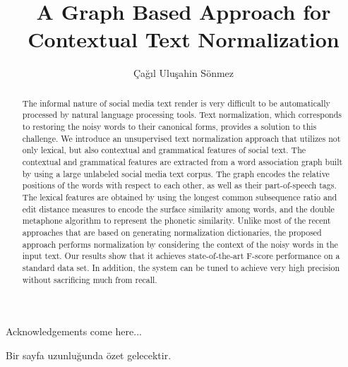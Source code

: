 \documentclass[a4paper,onesided,12pt]{report}
\title{A Graph Based Approach for Contextual Text Normalization}
\author{Çağıl Uluşahin Sönmez}
\begin{document}
\makemstitle %
\makeapprovalpage
\begin{acknowledgements}
Acknowledgements come here...
\end{acknowledgements}
\begin{abstract}
The informal nature of social media text render is very difficult to be automatically processed by natural language processing tools. Text normalization, which corresponds to restoring the noisy words to their canonical forms, provides a solution to this challenge.
We introduce an unsupervised text normalization approach that utilizes not only lexical, but also contextual and grammatical features of social text.
The contextual and grammatical features are extracted from a word association graph built by using a large unlabeled social media text corpus.
The graph encodes the relative positions of the words with respect to each other, as well as their part-of-speech tags.
The lexical features are obtained by using the longest common subsequence ratio and edit distance measures to encode the surface similarity among words, and the double metaphone algorithm to represent the phonetic similarity. Unlike most of the recent approaches that are based on generating normalization dictionaries, the proposed approach performs normalization by considering the context of the noisy words in the input text.
Our results show that it achieves state-of-the-art F-score performance on a standard data set. In addition, the system can be tuned to achieve very high precision without sacrificing much from recall.
\end{abstract}
\begin{ozet}
Bir sayfa uzunluğunda özet gelecektir.
\end{ozet}
\tableofcontents
\listoffigures
\listoftables
\begin{symbols}
%

\sym{}{}
\sym{ }{}

\end{symbols}
\end{document}
